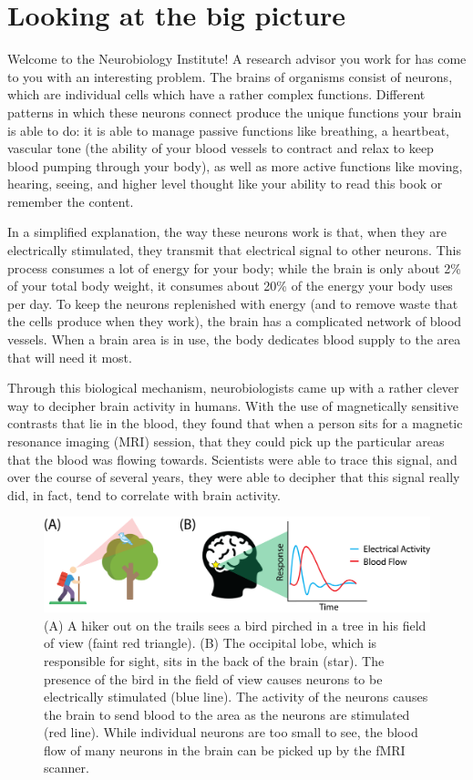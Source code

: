 \section{Looking at the big picture}
\label{sec:ch2:bigpicture}


Welcome to the Neurobiology Institute! A research advisor you work for has come to you with an interesting problem. The brains of organisms consist of neurons, which are individual cells which have a rather complex functions. Different patterns in which these neurons connect produce the unique functions your brain is able to do: it is able to manage passive functions like breathing, a heartbeat, vascular tone (the ability of your blood vessels to contract and relax to keep blood pumping through your body), as well as more active functions like moving, hearing, seeing, and higher level thought like your ability to read this book or remember the content.

In a simplified explanation, the way these neurons work is that, when they are electrically stimulated, they transmit that electrical signal to other neurons. This process consumes a lot of energy for your body; while the brain is only about 2\% of your total body weight, it consumes about 20\% of the energy your body uses per day. To keep the neurons replenished with energy (and to remove waste that the cells produce when they work), the brain has a complicated network of blood vessels. When a brain area is in use, the body dedicates blood supply to the area that will need it most.

Through this biological mechanism, neurobiologists came up with a rather clever way to decipher brain activity in humans. With the use of magnetically sensitive contrasts that lie in the blood, they found that when a person sits for a magnetic resonance imaging (MRI) session, that they could pick up the particular areas that the blood was flowing towards. Scientists were able to trace this signal, and over the course of several years, they were able to decipher that this signal really did, in fact, tend to correlate with brain activity. 

\begin{figure}[h]
    \centering
    \includegraphics[width=\linewidth]{foundations/ch2/Images/fmri_bold.png}
    \caption[BOLD f-MRI]{(A) A hiker out on the trails sees a bird pirched in a tree in his field of view (faint red triangle). (B) The occipital lobe, which is responsible for sight, sits in the back of the brain (star). The presence of the bird in the field of view causes neurons to be electrically stimulated (blue line). The activity of the neurons causes the brain to send blood to the area as the neurons are stimulated (red line). While individual neurons are too small to see, the blood flow of many neurons in the brain can be picked up by the fMRI scanner.}
    \label{fig:fmri-bold}
\end{figure}

